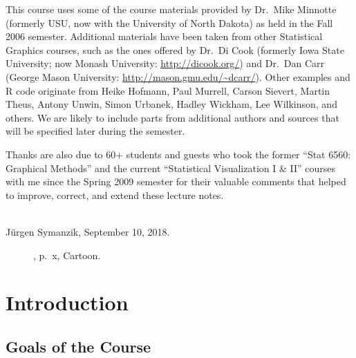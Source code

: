 \documentclass[12pt,letterpaper,final]{article}
\begin{document}
This course uses some of the course materials provided by
Dr.\ Mike Minnotte (formerly USU, now with the University of
North Dakota) as held in the Fall 2006 semester. Additional materials
have been taken from other Statistical Graphics courses, such as the
ones offered by Dr.\ Di Cook (formerly Iowa State University; now Monash University:
\url{http://dicook.org/}) and
Dr.\ Dan Carr (George Mason University: \url{http://mason.gmu.edu/~dcarr/}).
Other examples and R code originate from 
Heike Hofmann, Paul Murrell, Carson Sievert,
Martin Theus, Antony Unwin, Simon Urbanek, 
Hadley Wickham, Lee Wilkinson, and others.
We are likely to include parts from additional authors and sources
that will be specified later during the semester.

Thanks are also due to 60+ students and guests who took 
the former ``Stat 6560: Graphical Methods'' and
the current ``Statistical Visualization I \& II'' courses
with me since the Spring 2009 semester 
for their valuable comments that helped
to improve, correct, and extend these lecture notes.

~\\
J\"urgen Symanzik, September 10, 2018.


\begin{figure}[ht]
\caption{\label{Zelazny_px_Fig}
\cite{Ze2001}, p.~x, Cartoon.
}
\end{figure}

\newpage

%
{}

\newpage


\setcounter{page}{1}


\def\jsprivatechzero{1} %



\section{Introduction}


\subsection{Goals of the Course}
\end{document}
